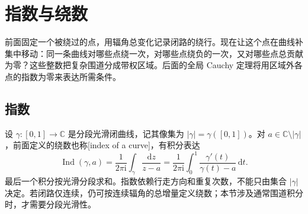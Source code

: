 \section{指数与绕数}
\label{b3:sec:1001}

前面固定一个被绕过的点，用辐角总变化记录闭路的绕行。现在让这个点在曲线补集中移动：同一条曲线对哪些点绕一次，对哪些点绕负的一次，又对哪些点总贡献为零？这些整数把复杂围道分成带权区域。后面的全局 Cauchy 定理将用区域外各点的指数为零来表达所需条件。

\subsection{指数}
\label{b3:subsec:100101}

设 \(\gamma:[0,1]\to\mathbb C\) 是分段光滑闭曲线，记其像集为 \(|\gamma|=\gamma([0,1])\)。对 \(a\in\mathbb C\setminus|\gamma|\)，前面定义的绕数也称[index of a curve]，有积分表达
\[
 \operatorname{Ind}(\gamma,a)
 =\frac1{2\pi\mathrm i}\int_\gamma\frac{\mathrm dz}{z-a}
 =\frac1{2\pi\mathrm i}\int_0^1
   \frac{\gamma'(t)}{\gamma(t)-a}\,\mathrm dt.
\]
最后一个积分按光滑分段求和。指数依赖行走方向和重复次数，不能只由集合 \(|\gamma|\) 决定。若闭路仅连续，仍可按连续辐角的总增量定义绕数；本节涉及通常围道积分时，才需要分段光滑性。

